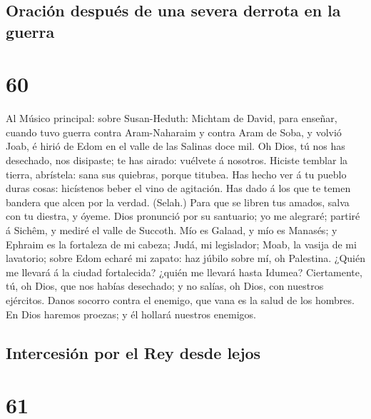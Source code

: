 \hypertarget{oraciuxf3n-despuuxe9s-de-una-severa-derrota-en-la-guerra}{%
\subsection{Oración después de una severa derrota en la
guerra}\label{oraciuxf3n-despuuxe9s-de-una-severa-derrota-en-la-guerra}}

\hypertarget{section-59}{%
\section{60}\label{section-59}}

 Al Músico principal: sobre Susan-Heduth: Michtam de
David, para enseñar, cuando tuvo guerra contra Aram-Naharaim y contra
Aram de Soba, y volvió Joab, é hirió de Edom en el valle de las Salinas
doce mil. Oh Dios, tú nos has desechado, nos disipaste; te has airado:
vuélvete á nosotros.  Hiciste temblar la tierra,
abrístela: sana sus quiebras, porque titubea.  Has hecho
ver á tu pueblo duras cosas: hicístenos beber el vino de agitación.
 Has dado á los que te temen bandera que alcen por la
verdad. (Selah.)  Para que se libren tus amados, salva con
tu diestra, y óyeme.  Dios pronunció por su santuario; yo
me alegraré; partiré á Sichêm, y mediré el valle de Succoth.
 Mío es Galaad, y mío es Manasés; y Ephraim es la
fortaleza de mi cabeza; Judá, mi legislador;  Moab, la
vasija de mi lavatorio; sobre Edom echaré mi zapato: haz júbilo sobre
mí, oh Palestina.  ¿Quién me llevará á la ciudad
fortalecida? ¿quién me llevará hasta Idumea? 
Ciertamente, tú, oh Dios, que nos habías desechado; y no salías, oh
Dios, con nuestros ejércitos.  Danos socorro contra el
enemigo, que vana es la salud de los hombres.  En Dios
haremos proezas; y él hollará nuestros enemigos.

\hypertarget{intercesiuxf3n-por-el-rey-desde-lejos}{%
\subsection{Intercesión por el Rey desde
lejos}\label{intercesiuxf3n-por-el-rey-desde-lejos}}

\hypertarget{section-60}{%
\section{61}\label{section-60}}

